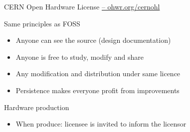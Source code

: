 \documentclass[compress,red]{beamer}
\begin{document}
\begin{frame}{CERN Open Hardware License \href{http://ohwr.org/cernohl}{-- ohwr.org/cernohl}}
	\begin{block}{Same principles as FOSS}
 \begin{itemize}
	 \item Anyone can see the source (design documentation)
	\item Anyone is free to study, modify and share
	\item Any modification and distribution under same licence
	\item Persistence makes everyone profit from improvements
\end{itemize}
	\end{block}

	\begin{block}{Hardware production}
 \begin{itemize}
	\item When produce: licensee is invited to inform the licensor
\end{itemize}
	\end{block}

%
\end{frame}



\end{document}
